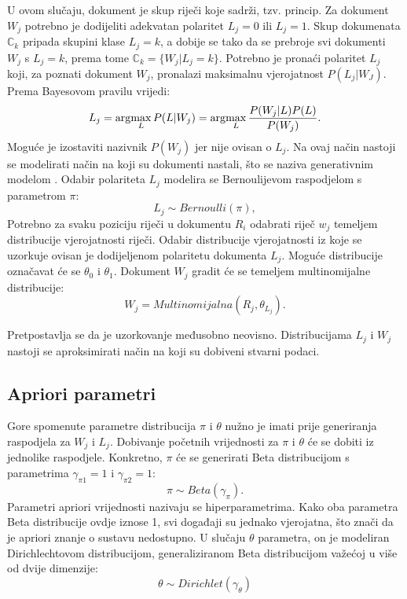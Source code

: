 U ovom slučaju, dokument je skup riječi koje sadrži, tzv.  princip. Za dokument $W_j$ potrebno je dodijeliti adekvatan polaritet $L_j = 0$ ili $L_j = 1$. Skup dokumenata $\mathbb{C}_{k}$ pripada skupini klase $L_j = k$, a dobije se tako da se prebroje svi dokumenti $W_j$ s $L_j=k$, prema tome $\mathbb{C}_{k} = \{W_j | L_j = k\}$. Potrebno je pronaći polaritet $L_j$ koji, za poznati dokument $W_j$, pronalazi maksimalnu vjerojatnost $P(L_j|W_J)$. Prema Bayesovom pravilu vrijedi:
\begin{equation}
L_j = \arg\!\max_L P(L|W_j) = \arg\!\max_L \frac{P(W_j|L)P(L)}{P(W_j)}.
\end{equation}
Moguće je izostaviti nazivnik $P(W_j)$ jer nije ovisan o $L_j$. Na ovaj način nastoji se modelirati način na koji su dokumenti nastali, što se naziva generativnim modelom . Odabir polariteta $L_j$ modelira se Bernoulijevom raspodjelom s parametrom $\pi$:
\begin{equation}
L_j \sim Bernoulli(\pi),
\end{equation} Potrebno za svaku poziciju riječi u dokumentu $R_i$ odabrati riječ $w_j$ temeljem distribucije vjerojatnosti riječi. Odabir distribucije vjerojatnosti iz koje se uzorkuje ovisan je dodijeljenom polaritetu dokumenta $L_j$. Moguće distribucije označavat će se $\theta_0$ i $\theta_1$. Dokument $W_j$ gradit će se temeljem multinomijalne distribucije:
\begin{equation}
W_j = Multinomijalna(R_j, \theta_{L_{j}}).
\end{equation}

Pretpostavlja se da je uzorkovanje međusobno neovisno. Distribucijama $L_j$ i $W_j$ nastoji se aproksimirati način na koji su dobiveni stvarni podaci. 

\subsection{Apriori parametri}

Gore spomenute parametre distribucija $\pi$ i $\theta$ nužno je imati prije generiranja raspodjela za $W_j$ i $L_j$. Dobivanje početnih vrijednosti za $\pi$ i $\theta$ će se dobiti iz jednolike raspodjele. Konkretno, $\pi$ će se generirati Beta distribucijom s parametrima $\gamma_{\pi 1} = 1$ i $\gamma_{\pi 2} = 1$:
\begin{equation}
\pi \sim Beta(\gamma_{\pi}).
\end{equation}
Parametri apriori vrijednosti nazivaju se hiperparametrima. Kako oba parametra Beta distribucije ovdje iznose 1, svi događaji su jednako vjerojatna, što znači da je apriori znanje o sustavu nedostupno. U slučaju $\theta$ parametra, on je modeliran Dirichlechtovom distribucijom, generaliziranom Beta distribucijom važećoj u više od dvije dimenzije:
\begin{equation}
\theta \sim Dirichlet(\gamma_{\theta})
\end{equation}

